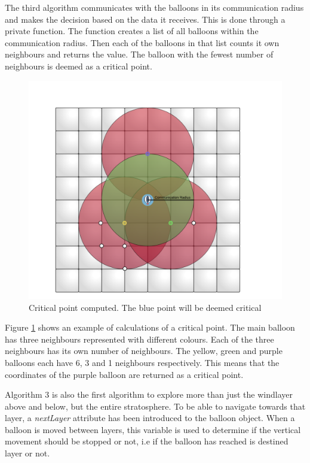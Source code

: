 The third algorithm communicates with the balloons in its communication radius and makes the decision based on the data it receives. This is done through a private function. The function creates a list of all balloons within the communication radius. Then each of the balloons in that list counts it own neighbours and returns the value. The balloon with the fewest number of neighbours is deemed as a critical point. 

\begin{figure}[H]
    \centering
    \includegraphics[scale=0.5]{graphics/criticalPointimproved.pdf}
    \caption{Critical point computed. The blue point will be deemed critical}
    \label{fig:criticalf}
\end{figure}

Figure \ref{fig:criticalf} shows an example of calculations of a critical point. The main balloon has three neighbours represented with different colours. Each of the three neighbours has its own number of neighbours. The yellow, green and purple balloons each have 6, 3 and 1 neighbours respectively. This means that the coordinates of the purple balloon are returned as a critical point.

Algorithm 3 is also the first algorithm to explore more than just the windlayer above and below, but the entire stratosphere. To be able to navigate towards that layer, a  \textit{nextLayer} attribute has been introduced to the balloon object. When a balloon is moved between layers, this variable is used to determine if the vertical movement should be stopped or not, i.e if the balloon has reached is destined layer or not.

